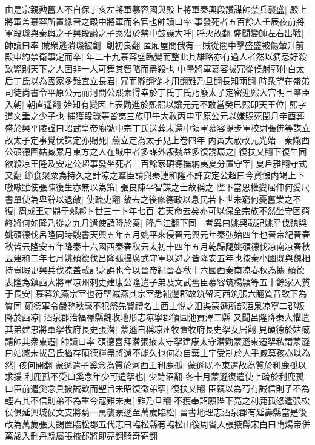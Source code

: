 由是宗親勲舊人不自保丁亥左將軍慕容國與殿上將軍秦輿段讃謀帥禁兵襲盛|{
	殿上將軍盖慕容所置緣晉之殿中將軍而名官也帥讀曰率}
事發死者五百餘人壬辰夜前將軍段璣與秦輿之子興段讃之子泰潜於禁中鼓譟大呼|{
	呼火故翻}
盛聞變帥左右出戰|{
	帥讀曰率}
賊衆逃潰璣被創|{
	創初良翻}
匿廂屋間俄有一賊從闇中擊盛盛被傷輦升前殿申約禁衛事定而卒|{
	年二十九慕容盛臨變而整此其雄略亦有過人者然以猜忌好殺致斃則天下之人固非一人可舞其智略而盡殺也}
中壘將軍慕容拔冗從僕射郭仲白太后丁氏以為國家多難宜立長君|{
	冗而隴翻從才用翻難乃旦翻長知兩翻}
時衆望在盛弟司徒尚書令平原公元而河間公熙素得幸於丁氏丁氏乃廢太子定密迎熙入宫明旦羣臣入朝|{
	朝直遥翻}
始知有變因上表勸進於熙熙以讓元元不敢當癸巳熙即天王位|{
	熙字道文垂之少子也}
捕獲段璣等皆夷三族甲午大赦丙申平原公元以嫌賜死閏月辛酉葬盛於興平陵諡曰昭武皇帝廟號中宗丁氏送葬未還中領軍慕容提步軍校尉張佛等謀立故太子定事覺伏誅定亦賜死|{
	燕立定為太子見上卷四年}
丙寅大赦改元光始　秦隴西公碩德圍姑臧累月東方之人在城中者多謀外叛魏益多復誘扇之|{
	復扶又翻下復生同}
欲殺凉王隆及安定公超事發坐死者三百餘家碩德撫納夷夏分置守宰|{
	夏戶雅翻守式又翻}
節食聚粟為持久之計凉之羣臣請與秦連和隆不許安定公超曰今資儲内竭上下嗷嗷雖使張陳復生亦無以為策|{
	張良陳平智謀之士故稱之}
陛下當思權變屈伸何愛尺書單使為卑辭以退敵|{
	使疏吏翻}
敵去之後修德政以息民若卜世未窮何憂舊業之不復|{
	周成王定鼎于郟鄏卜世三十卜年七百}
若天命去矣亦可以保全宗族不然坐守困窮終將何如隆乃從之九月遣使請降於秦|{
	降戶江翻下同　考異曰姚興載記姚平伐魏與姚碩德伐呂隆同時魏書天興五年五月姚平來侵晉元興元年秦弘始四年也晉帝紀晉春秋皆云隆安五年降秦十六國西秦春秋云太初十四年五月乾歸隨姚碩德伐凉南凉春秋云建和二年七月姚碩德伐呂隆孤攝廣武守軍以避之皆隆安五年也按秦小國既與魏相持豈暇更興兵伐凉盖載記之誤也今以晉帝紀晉春秋十六國西秦南凉春秋為據}
碩德表隆為鎮西大將軍凉州刺史建康公隆遣子弟及文武舊臣慕容筑楊頴等五十餘家入質于長安|{
	慕容筑燕宗室也苻堅滅燕其宗室悉補邊郡故筑留河西筑張六翻質音致下為質同}
碩德軍令嚴整秋毫不犯祭先賢禮名士西土悦之沮渠蒙遜所部酒泉凉寧二郡叛降於西凉|{
	酒泉郡治福禄縣魏收地形志凉寧郡領園池貢澤二縣}
又聞呂隆降秦大懼遣其弟建忠將軍挐牧府長史張潜|{
	蒙遜自稱凉州牧置牧府長史挐女居翻}
見碩德於姑臧請帥其衆東遷|{
	帥讀曰率}
碩德喜拜潜張掖太守挐建康太守潜勸蒙遜東遷挐私謂蒙遜曰姑臧未拔呂氏猶存碩德糧盡將還不能久也何為自棄土宇受制於人乎臧莫孩亦以為然|{
	孩何開翻}
蒙遜遣子奚念為質於河西王利鹿孤|{
	蒙遜既不東遷故為質於利鹿孤以求援}
利鹿孤不受曰奚念年少可遣挐也|{
	少詩沼翻}
冬十月蒙遜復遣使上疏於利鹿孤曰臣前遣奚念具披誠欵而聖旨未昭復徵弟挐|{
	復扶又翻}
臣竊以為苟有誠信則子不為輕若其不信則弟不為重今寇難未夷|{
	難乃旦翻}
不獲奉詔願陛下亮之利鹿孤怒遣張松侯俱延興城侯文支將騎一萬襲蒙遜至萬歲臨松|{
	晉書地理志酒泉郡有延壽縣當是後改為萬歲張天錫置臨松郡五代志曰臨松縣有臨松山後周省入張掖縣宋白曰隋煬帝併萬歲入刪丹縣屬張掖郡將即亮翻騎奇寄翻}
